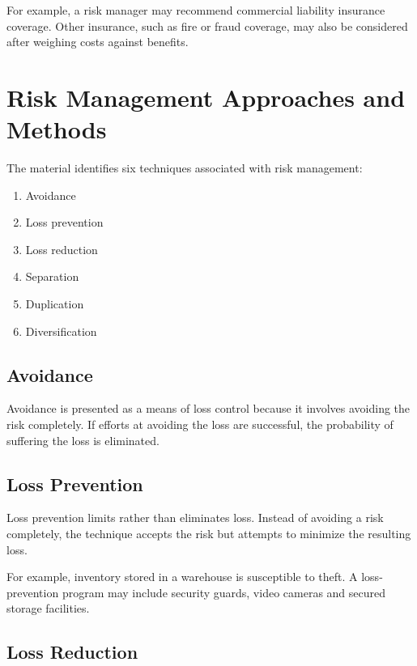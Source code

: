 \documentclass[
]{book}
\providecommand{\tightlist}{%
  \setlength{\itemsep}{0pt}\setlength{\parskip}{0pt}}
\begin{document}
For example, a risk manager may recommend commercial liability insurance coverage. Other insurance, such as fire or fraud coverage, may also be considered after weighing costs against benefits.

\chapter{Risk Management Approaches and Methods}\label{risk-management-approaches-and-methods}

The material identifies six techniques associated with risk management:

\begin{enumerate}
\def\labelenumi{\arabic{enumi}.}
\tightlist
\item
  Avoidance
\item
  Loss prevention
\item
  Loss reduction
\item
  Separation
\item
  Duplication
\item
  Diversification
\end{enumerate}

\section{Avoidance}\label{avoidance}

Avoidance is presented as a means of loss control because it involves avoiding the risk completely. If efforts at avoiding the loss are successful, the probability of suffering the loss is eliminated.

\section{Loss Prevention}\label{loss-prevention}

Loss prevention limits rather than eliminates loss. Instead of avoiding a risk completely, the technique accepts the risk but attempts to minimize the resulting loss.

For example, inventory stored in a warehouse is susceptible to theft. A loss-prevention program may include security guards, video cameras and secured storage facilities.

\section{Loss Reduction}\label{loss-reduction}
\end{document}
